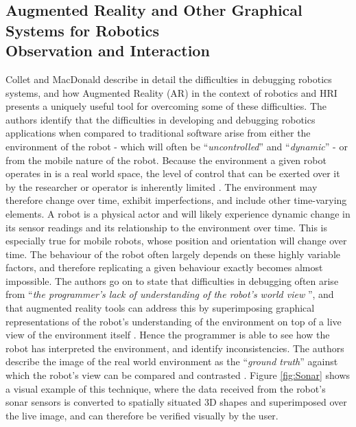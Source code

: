 \documentclass[hidelinks,10pt]{article}
\begin{document}
\subsection{Augmented Reality and Other Graphical Systems for Robotics \\Observation and Interaction} \label{VRAndAR}
Collet and MacDonald \cite{AugmentedRealityDebuggingSystem} describe in detail the difficulties in debugging robotics systems, and how Augmented Reality (AR) in the context of robotics and HRI presents a uniquely useful tool for overcoming some of these difficulties. The authors identify that the difficulties in developing and debugging robotics applications when compared to traditional software arise from either the environment of the robot - which will often be ``\textit{uncontrolled}'' and ``\textit{dynamic}'' - or from the mobile nature of the robot. Because the environment a given robot operates in is a real world space, the level of control that can be exerted over it by the researcher or operator is inherently limited \cite{AugmentedRealityDebuggingSystem}. The environment may therefore change over time, exhibit imperfections, and include other time-varying elements. A robot is a physical actor and will likely experience dynamic change in its sensor readings and its relationship to the environment over time. This is especially true for mobile robots, whose position and orientation will change over time. The behaviour of the robot often largely depends on these highly variable factors, and therefore replicating a given behaviour exactly becomes almost impossible. The authors go on to state that difficulties in debugging often arise from ``\textit{the programmer's lack of understanding of the robot's world view} \cite{AugmentedRealityDebuggingSystem}'', and that augmented reality tools can address this by superimposing graphical representations of the robot's understanding of the environment on top of a live view of the environment itself \cite{AugmentedRealityDebuggingSystem}. Hence the programmer is able to see how the robot has interpreted the environment, and identify inconsistencies. The authors describe the image of the real world environment as the ``\textit{ground truth}'' against which the robot's view can be compared and contrasted \cite{AugmentedRealityDebuggingSystem}. Figure \ref{fig:Sonar} shows a visual example of this technique, where the data received from the robot's sonar sensors is converted to spatially situated 3D shapes and superimposed over the live image, and can therefore be verified visually by the user.
\end{document}
